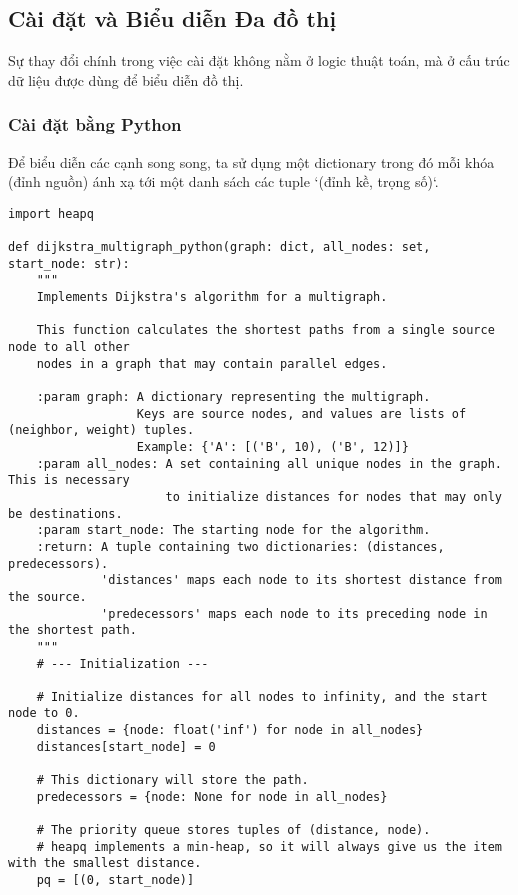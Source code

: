 \documentclass[a4paper,12pt]{article}
\begin{document}
\subsection{Cài đặt và Biểu diễn Đa đồ thị}
Sự thay đổi chính trong việc cài đặt không nằm ở logic thuật toán, mà ở cấu trúc dữ liệu được dùng để biểu diễn đồ thị.

\subsubsection{Cài đặt bằng Python}
Để biểu diễn các cạnh song song, ta sử dụng một dictionary trong đó mỗi khóa (đỉnh nguồn) ánh xạ tới một danh sách các tuple `(đỉnh kề, trọng số)`.
\begin{lstlisting}[style=pythonstyle, caption={Cài đặt Dijkstra cho đa đồ thị trong Python.}, label={lst:python_multi_full}]
import heapq

def dijkstra_multigraph_python(graph: dict, all_nodes: set, start_node: str):
    """
    Implements Dijkstra's algorithm for a multigraph.

    This function calculates the shortest paths from a single source node to all other
    nodes in a graph that may contain parallel edges.

    :param graph: A dictionary representing the multigraph.
                  Keys are source nodes, and values are lists of (neighbor, weight) tuples.
                  Example: {'A': [('B', 10), ('B', 12)]}
    :param all_nodes: A set containing all unique nodes in the graph. This is necessary
                      to initialize distances for nodes that may only be destinations.
    :param start_node: The starting node for the algorithm.
    :return: A tuple containing two dictionaries: (distances, predecessors).
             'distances' maps each node to its shortest distance from the source.
             'predecessors' maps each node to its preceding node in the shortest path.
    """
    # --- Initialization ---
    
    # Initialize distances for all nodes to infinity, and the start node to 0.
    distances = {node: float('inf') for node in all_nodes}
    distances[start_node] = 0
    
    # This dictionary will store the path.
    predecessors = {node: None for node in all_nodes}
    
    # The priority queue stores tuples of (distance, node).
    # heapq implements a min-heap, so it will always give us the item with the smallest distance.
    pq = [(0, start_node)]


\end{lstlisting}
\end{document}
